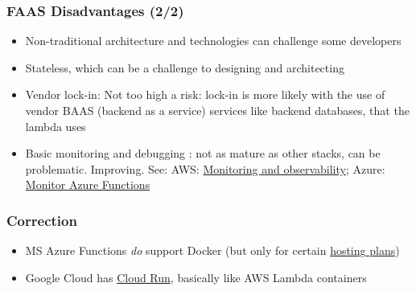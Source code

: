 \documentclass[11pt,aspectratio=169]{beamer}
\begin{document}
\begin{nrcanFrame}
  \frametitle{FAAS Disadvantages (2/2)}
    \begin{itemize}
  \item Non-traditional architecture and technologies can challenge some developers
  \item Stateless, which can be a challenge to designing and architecting
  \item Vendor lock-in: Not too high a risk: lock-in is more likely
    with the use of vendor BAAS (backend as a service) services like
    backend databases, that the lambda uses
  \item Basic monitoring and debugging : not as mature as other stacks,
    can be problematic.
    Improving. See: AWS: \href{https://docs.aws.amazon.com/lambda/latest/operatorguide/monitoring-observability.html}{Monitoring and observability}; Azure: \href{https://docs.microsoft.com/en-us/azure/azure-functions/functions-monitoring}{Monitor Azure Functions}
    \end{itemize}
\end{nrcanFrame}



\begin{nrcanFrame}
  \frametitle{Correction}
  \begin{itemize}
  \item MS Azure Functions \textit{do} support Docker (but only for certain
    \href{https://docs.microsoft.com/en-us/azure/azure-functions/functions-scale}{hosting
      plans})
    \item Google Cloud has \href{https://cloud.google.com/run}{Cloud
      Run}, basically like AWS Lambda containers
  \end{itemize}
\end{nrcanFrame}


\nrcanLastFrame
\end{document}

